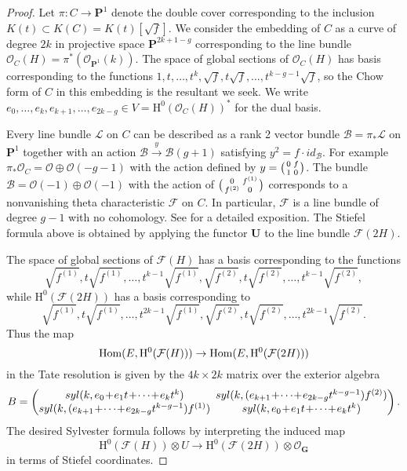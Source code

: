 \documentclass{jams-l}
\theoremstyle{definition}
\theoremstyle{remark}
\newcommand{\B}{{\mathcal B}}
\newcommand{\F}{{\mathcal F}}
\newcommand{\GG}{{\mathbf G}}
\newcommand{\Hrm}{{\mathrm H}}
\newcommand{\Lcal}{{\mathcal L}}
\newcommand{\Ocal}{{\mathcal O}}
\newcommand{\PP}{{\mathbf P}}
\newcommand{\UU}{{\mathbf U}}
\newcommand{\tensor}{\otimes}
\newcommand{\Hom}{{\mathop{\rm Hom}\nolimits}}
\newcommand{\rTo}{\xrightarrow}
\newcommand{\rTox}{\rightarrow}
\begin{document}
\begin{proof} Let $\pi: C \to \PP^1$ denote the double
cover corresponding to the inclusion $K(t)\subset K(C)=K(t)[\sqrt f]$.
We consider the embedding of $C$ as a curve of degree $2k$ 
in projective space $\PP^{2k+1-g}$
corresponding to the line bundle $\Ocal_C(H)=\pi^*(\Ocal_{\PP^1}(k))$. 
The space of global sections of $\Ocal_C(H)$ has basis corresponding
to the functions
$1,t,\ldots,t^k,\sqrt f,t\sqrt f,\ldots, t^{k-g-1}\sqrt f$,
so the Chow form of $C$ in this embedding is the resultant we seek.
We write $e_0,\ldots,e_k,e_{k+1},\ldots,e_{2k-g}\in V=\Hrm^0(\Ocal_C(H))^*$
for the dual basis.

Every line bundle $\Lcal$ on $C$ can be described as a rank 2 vector bundle
$\B=\pi_* \Lcal$ on $\PP^1$ together with an action $\B \rTo y \B(g+1)$ satisfying
$y^2= f \cdot id_\B$. For example $\pi_* \Ocal_C = \Ocal \oplus \Ocal(-g-1)$ with the action
defined by $y=\bigl({0 \atop 1}{f\atop 0}\bigr)$. The bundle
$\B=\Ocal(-1)\oplus\Ocal(-1)$ with the action of 
$\bigl({0\atop f^{(2)}}{f^{(1)} \atop 0}\bigr)$ 
corresponds to a nonvanishing 
theta characteristic $\F$ on $C$. In particular, $\F$ is a line bundle of
degree $g-1$ with no cohomology.
See \cite{Buchweitz and Schreyer 2002} for a detailed exposition.
The Stiefel
formula above is obtained by applying the functor $\UU$ to the line bundle
$\F(2H)$.

The space of global sections of $\F(H)$ has a basis corresponding to
the functions
\[
\sqrt{f^{(1)}},t\sqrt{f^{(1)}},\ldots,t^{k-1}\sqrt{f^{(1)}},
\sqrt{f^{(2)}},t\sqrt{f^{(2)}},\ldots,t^{k-1}\sqrt{f^{(2)}},
\]
while  $\Hrm^0(\F(2H))$ has a basis corresponding to
\[
\sqrt{f^{(1)}},t\sqrt{f^{(1)}},\ldots,t^{2k-1}\sqrt{f^{(1)}},
\sqrt{f^{(2)}},t\sqrt{f^{(2)}},\ldots,t^{2k-1}\sqrt{f^{(2)}}.
\]
Thus the map
\[
\Hom(E,\Hrm^0(\F(H))) \to \Hom(E,\Hrm^0(\F(2H)))
\]
in the Tate resolution is given 
by the $4k\times 2k$ matrix over the exterior algebra
\[\def\scriptstyle{\let\ldots\cdots \medmuskip1mu}
B=\begin{pmatrix}\scriptstyle syl(k,e_0+e_1t+\ldots+e_kt^k) &
\scriptstyle \hskip-5pt
syl(k,(e_{k+1}+\ldots+ e_{2k-g}t^{k-g-1})f^{(2)}) \\
\scriptstyle syl(k,(e_{k+1}+\ldots+
e_{2k-g}t^{k-g-1})f^{(1)}) 
&\scriptstyle \hskip-5pt syl(k,e_0+e_1t+\ldots+e_kt^k)
\end{pmatrix}.
\]
The desired Sylvester formula follows by interpreting the induced map
\[
\Hrm^0(\F(H)) \tensor U \rTox \Hrm^0(\F(2H)) \tensor \Ocal_\GG
\]
in terms of Stiefel coordinates.
\end{proof}
\end{document}
